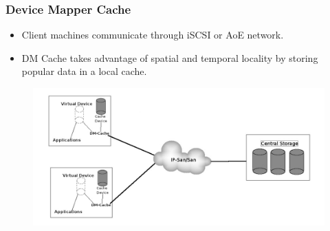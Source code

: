 \documentclass{beamer}
\begin{document}
    \begin{frame}
	\frametitle{Device Mapper Cache}
	\begin{itemize}
	    \item Client machines communicate through iSCSI or AoE network.
	    \item DM Cache takes advantage of spatial and temporal locality
		by storing popular data in a local cache.
	\end{itemize}
	\begin{figure}
	    \centering \includegraphics[scale=.30]{DMC.jpg}
	    \label{fig:dmc}
	\end{figure}
    \end{frame}
%
\end{document}
